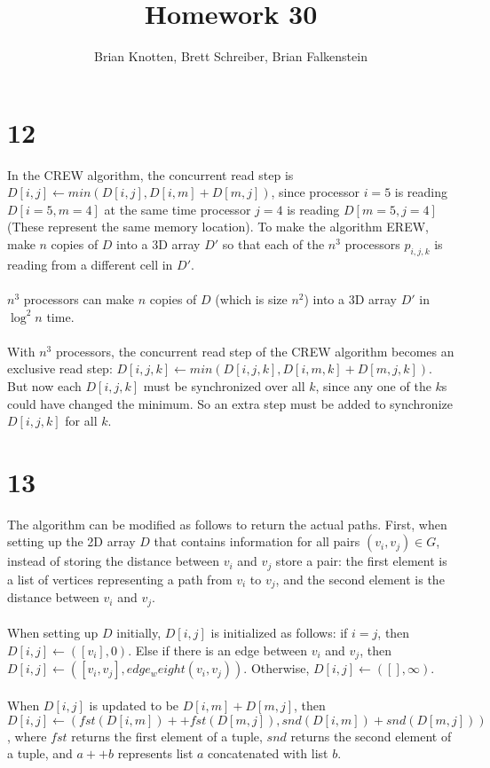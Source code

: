 \documentclass[letterpaper,notitlepage,twoside]{article}
\begin{document}
\title{Homework 30}
\author{Brian Knotten, Brett Schreiber, Brian Falkenstein}
\maketitle

\section*{12}
In the CREW algorithm, the concurrent read step is $D[i,j] \gets min(D[i, j], D[i, m] + D[m, j])$, since processor $i = 5$ is reading $D[i = 5, m = 4]$ at the same time processor $j = 4$ is reading $D[m = 5, j = 4]$ (These represent the same memory location). To make the algorithm EREW, make $n$ copies of $D$ into a 3D array $D'$ so that each of the $n^3$ processors $p_{i, j, k}$ is reading from a different cell in $D'$.
\\\\
$n^3$ processors can make $n$ copies of $D$ (which is size $n^2$) into a 3D array $D'$ in $\log^2 n$ time.
\\\\
With $n^3$ processors, the concurrent read step of the CREW algorithm becomes an exclusive read step: $D[i, j, k] \gets min(D[i, j, k], D[i, m, k] + D[m, j, k])$. But now each $D[i, j, k]$ must be synchronized over all $k$, since any one of the $k$s could have changed the minimum. So an extra step must be added to synchronize $D[i, j, k]$ for all $k$.

\section*{13}
The algorithm can be modified as follows to return the actual paths. First, when setting up the 2D array $D$ that contains information for all pairs $(v_i, v_j) \in G$, instead of storing the distance between $v_i$ and $v_j$ store a pair: the first element is a list of vertices representing a path from $v_i$ to $v_j$, and the second element is the distance between $v_i$ and $v_j$.
\\\\
When setting up $D$ initially, $D[i, j]$ is initialized as follows: if $i = j$, then $D[i, j] \gets ([v_i], 0)$. Else if there is an edge between $v_i$ and $v_j$, then $D[i, j] \gets ([v_i, v_j], edge_weight(v_i, v_j))$. Otherwise, $D[i, j] \gets ([], \infty)$.
\\\\
When $D[i, j]$ is updated to be $D[i, m] + D[m, j]$, then $D[i, j] \gets (fst(D[i, m]) ++ fst(D[m, j]), snd(D[i, m]) + snd(D[m, j]))$, where $fst$ returns the first element of a tuple, $snd$ returns the second element of a tuple, and $a ++ b$ represents list $a$ concatenated with list $b$.
\end{document}
